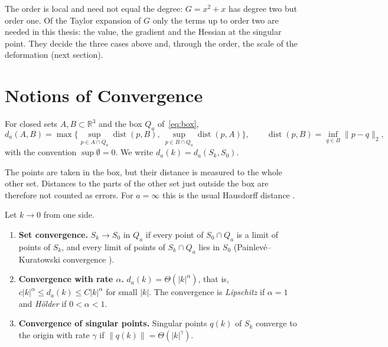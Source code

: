 The order is local and need not equal the degree: $G=x^2+x$ has degree two
but order one. Of the Taylor expansion of $G$ only the terms up to order two
are needed in this thesis: the value, the gradient and the Hessian at the
singular point. They decide the three cases above and, through the order, the
scale of the deformation (next section).

\section{Notions of Convergence}
\label{sec:convergence-notions}

\begin{definition}
\label{def:local-hausdorff}
For closed sets $A,B\subset\mathbb{R}^3$ and the box $Q_a$ of~\eqref{eq:box},
\[
d_a(A,B)=\max\Big\{\sup_{p\in A\cap Q_a}\operatorname{dist}(p,B),\
\sup_{p\in B\cap Q_a}\operatorname{dist}(p,A)\Big\},\qquad
\operatorname{dist}(p,B)=\inf_{q\in B}\|p-q\|_2 ,
\]
with the convention $\sup\emptyset=0$. We write $d_a(k)=d_a(S_k,S_0)$.
\end{definition}

The points are taken in the box, but their distance is measured to the whole
other set. Distances to the parts of the other set just outside the box are
therefore not counted as errors. For $a=\infty$ this is the usual Hausdorff
distance \cite{rockafellar1998variational}.

\begin{definition}
\label{def:convergence-types}
Let $k\to0$ from one side.
\begin{enumerate}
    \item \textbf{Set convergence.} $S_k\to S_0$ in $Q_a$ if every point of
          $S_0\cap Q_a$ is a limit of points of $S_k$, and every limit of
          points of $S_k\cap Q_a$ lies in $S_0$ (Painlevé--Kuratowski
          convergence \cite{rockafellar1998variational}).
    \item \textbf{Convergence with rate $\alpha$.} $d_a(k)=\Theta(|k|^\alpha)$,
          that is, $c|k|^\alpha\le d_a(k)\le C|k|^\alpha$ for small $|k|$. The
          convergence is \emph{Lipschitz} if $\alpha=1$ and \emph{Hölder} if
          $0<\alpha<1$.
    \item \textbf{Convergence of singular points.} Singular points $q(k)$ of
          $S_k$ converge to the origin with rate $\gamma$ if
          $\|q(k)\|=\Theta(|k|^\gamma)$.
\end{enumerate}
\end{definition}

